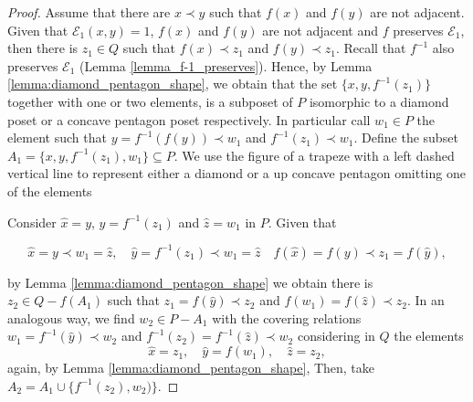\documentclass[10pt,a4paper]{amsart}
\newcommand{\E}{\mathcal{E}}
\begin{document}
\begin{proof}
    Assume that there are $x \prec y$ such that $f(x)$ and $f(y)$ are not adjacent. Given that $\E_1(x,y) = 1$, $f(x)$ and $f(y)$ are not adjacent and $f$ preserves $\E_1$, then there is $z_1 \in Q$ such that  $f(x) \prec z_1$ and $f(y) \prec z_1$. Recall that $f^{-1}$ also preserves $\E_1$ (Lemma \ref{lemma_f-1_preserves}). Hence, by Lemma \ref{lemma:diamond_pentagon_shape}, we obtain that the set 
    $\{x, y, f^{-1}(z_1)\}$ together with one or two elements, is a subposet of $P$ isomorphic to a diamond poset or a concave pentagon poset respectively.  In particular call $w_1 \in P$ the element such that $y = f^{-1}(f(y)) \prec w_1$ and $f^{-1}(z_1) \prec w_1$. Define the  subset $A_1 = \{ x,y,f^{-1}(z_1), w_1 \} \subseteq P$. We use the figure of a trapeze with a left dashed vertical line to represent either a diamond or a up concave pentagon omitting one of the elements

    \begin{center}
    \end{center}
    

    Consider $\hat{x} = y$, $\hat{y} = f^{-1}(z_1)$ and $\hat{z} = w_1$ in $P$. Given that 
    
    \[\hat{x} = y \prec w_1 = \hat{z}, \quad  \hat{y} = f^{-1}(z_1) \prec w_1 = \hat{z} \quad f(\hat{x}) = f(y) \prec z_1 = f(\hat{y}), \] 
    
    by Lemma \ref{lemma:diamond_pentagon_shape} we obtain there is $z_2 \in Q - f(A_1)$ such that $z_1 = f(\hat{y}) \prec z_2$ and $f(w_1) = f(\hat{z}) \prec z_2$. In an analogous way, we find $w_2 \in P - A_1$ with the covering relations $w_1 = f^{-1}(\hat{y}) \prec w_2$ and $f^{-1}(z_2) = f^{-1}(\hat{z}) \prec w_2$ considering in $Q$ the elements 
    \[\hat{x} = z_1, \quad \hat{y} = f(w_1), \quad \hat{z} = z_2, \] 
    again, by Lemma \ref{lemma:diamond_pentagon_shape},  Then, take $A_2 = A_1 \cup \{ f^{-1}(z_2) , w_2) \}$.


\end{proof}
\end{document}
